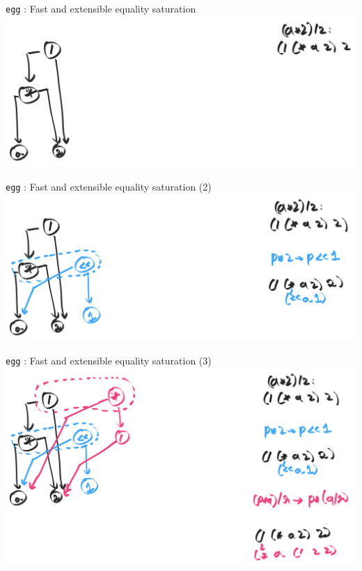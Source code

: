 \documentclass[8pt]{beamer}
\newcommand{\egg}{\texttt{egg} }
\begin{document}
\begin{frame}[fragile]{\egg: Fast and extensible equality saturation}
\includegraphics[width=\textwidth]{./eg-1-1.png}
\end{frame}

\begin{frame}[fragile]{\egg: Fast and extensible equality saturation (2)}
\includegraphics[width=\textwidth]{./eg-1-2.png}
\end{frame}         


\begin{frame}[fragile]{\egg: Fast and extensible equality saturation (3)}
\includegraphics[width=\textwidth]{./eg-1-3.png}
\end{frame}
\end{document}
